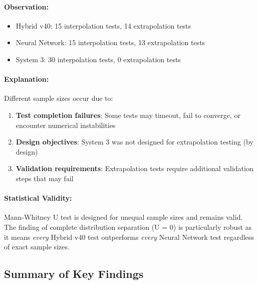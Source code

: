 \paragraph{Observation:}
\begin{itemize}
    \item Hybrid v40: 15 interpolation tests, 14 extrapolation tests
    \item Neural Network: 15 interpolation tests, 13 extrapolation tests
    \item System 3: 30 interpolation tests, 0 extrapolation tests
\end{itemize}

\paragraph{Explanation:}

Different sample sizes occur due to:
\begin{enumerate}
    \item \textbf{Test completion failures}: Some tests may timeout, fail to converge, or encounter numerical instabilities
    \item \textbf{Design objectives}: System 3 was not designed for extrapolation testing (by design)
    \item \textbf{Validation requirements}: Extrapolation tests require additional validation steps that may fail
\end{enumerate}

\paragraph{Statistical Validity:}

Mann-Whitney U test is designed for unequal sample sizes and remains valid. The finding of complete distribution separation (U = 0) is particularly robust as it means \emph{every} Hybrid v40 test outperforms \emph{every} Neural Network test regardless of exact sample sizes.


\subsection{Summary of Key Findings}
\label{sec:key_findings_summary}

